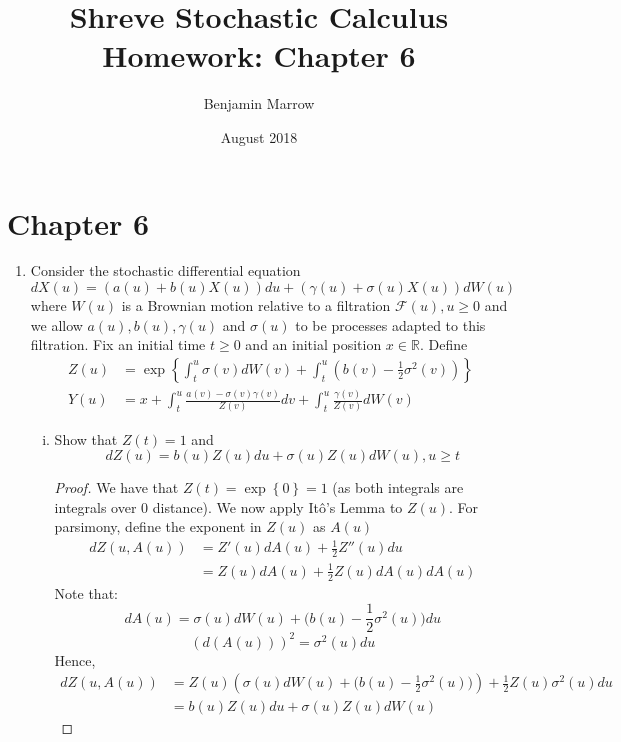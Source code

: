 \documentclass{article}
\title{Shreve Stochastic Calculus Homework: Chapter 6 \vspace{-1eX}}
\author{Benjamin Marrow \vspace{-1.5eX}}
\date{ August 2018  \vspace{-1eX}}
\makeatletter
\newcommand{\R}{\mathbb{R}}
\newcommand{\F}{\mathcal{F}}
\newcommand{\mylabel}[2]{#2\def\@currentlabel{#2}\label{#1}}
\newcommand{\pr}[1]{ \item[\mylabel{}{#1.}]}
\newcommand{\seq}[1]{\left\{ #1 \right\}}
\theoremstyle{definition}
\theoremstyle{definition}
\makeatother
\begin{document}
\maketitle


\section*{Chapter 6}

\begin{enumerate}
    \pr{6.1} Consider the stochastic differential equation
    \begin{equation}
        dX(u) = (a(u)+b(u)X(u)) du + (\gamma(u)+\sigma(u)X(u))dW(u) \tag{6.2.4}
    \end{equation}
    where $W(u)$ is a Brownian motion relative to a filtration $\F(u), u \geq 0$ and we allow $a(u),b(u), \gamma(u)$ and $\sigma(u)$ to be processes adapted to this filtration. Fix an initial time $t \geq 0$ and an initial position $x \in \R$. Define
    \begin{align*}
        Z(u) &= \exp \seq{\int_t^u \sigma(v)dW(v) + \int_t^u \left( b(v)-\frac{1}{2}\sigma^2(v)\right)} \\
        Y(u) &= x+ \int_t^u \frac{a(v)-\sigma(v)\gamma(v)}{Z(v)}dv + \int_t^u \frac{\gamma(v)}{Z(v)}dW(v)
    \end{align*}
    \begin{enumerate}[(i)]
        \item Show that $Z(t)=1$ and 
        $$ dZ(u) = b(u)Z(u)du + \sigma(u)Z(u)dW(u), u \geq t$$
        
        \begin{proof}
        We have that $Z(t)= \exp\seq{0}=1$ (as both integrals are integrals over $0$ distance). We now apply It\^{o}'s Lemma to $Z(u)$. For parsimony, define the exponent in $Z(u)$ as $A(u)$
        \begin{align*}
            dZ(u,A(u)) &= Z'(u)dA(u) + \frac{1}{2}Z''(u)du\\
            &= Z(u)dA(u) + \frac{1}{2}Z(u)dA(u)dA(u)
        \end{align*}
        Note that:
        $$ dA(u) = \sigma(u)dW(u) +\big(b(u)-\frac{1}{2}\sigma^2(u)\big)du$$
        $$ \left(d(A(u))\right)^2= \sigma^2(u)du$$
        Hence,
        \begin{align*}
            dZ(u,A(u)) &= Z(u)\left( \sigma(u)dW(u) +\big(b(u)-\frac{1}{2}\sigma^2(u)\big)\right) + \frac{1}{2}Z(u)\sigma^2(u)du \\
            &= b(u)Z(u)du + \sigma(u)Z(u)dW(u)
        \end{align*}
        

\end{proof}
\end{enumerate}
\end{enumerate}
\end{document}
